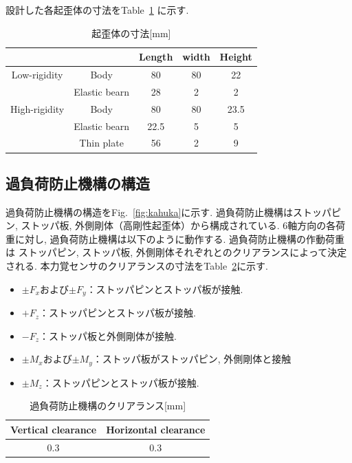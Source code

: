 設計した各起歪体の寸法をTable~\ref{tb:size} に示す. 
\begin{table}[h]
  \caption{起歪体の寸法[mm]}\label{tb:size}
  \begin{center}
   \begin{tabular}{ c c c c c }
    \hline
     & & Length & width & Height  \\
    \hline
    Low-rigidity & Body & 80 & 80 & 22  \\
    \cline{2-5}
     & Elastic bearn & 28 & 2 & 2  \\
    \hline
    High-rigidity & Body & 80 & 80 & 23.5  \\
    \cline{2-5}
     & Elastic bearn & 22.5 & 5 & 5  \\
    \cline{2-5}
     & Thin plate & 56 & 2 & 9 \\
    \hline
   \end{tabular}
  \end{center}
 \end{table}

\subsection{過負荷防止機構の構造}
過負荷防止機構の構造をFig.~\ref{fig:kahuka}に示す. 
過負荷防止機構はストッパピン, ストッパ板, 外側剛体（高剛性起歪体）から構成されている. 
6軸方向の各荷重に対し, 過負荷防止機構は以下のように動作する. 過負荷防止機構の作動荷重は
ストッパピン, ストッパ板, 外側剛体それぞれとのクリアランスによって決定される. 
本力覚センサのクリアランスの寸法をTable~\ref{tb:clea}に示す. 
\\
\begin{itemize}
  \item $\pm F_x$および$\pm F_y$：ストッパピンとストッパ板が接触. 
  \item $+F_z$：ストッパピンとストッパ板が接触. 
  \item $-F_z$：ストッパ板と外側剛体が接触. 
  \item $\pm M_x$および$\pm M_y$：ストッパ板がストッパピン, 外側剛体と接触
  \item $\pm M_z$：ストッパピンとストッパ板が接触. 
\end{itemize}
\begin{table}[h]
  \caption{過負荷防止機構のクリアランス[mm]}\label{tb:clea}
  \begin{center}
   \begin{tabular}{ c c }
    \hline
    Vertical clearance & Horizontal clearance  \\
    \hline
    0.3 & 0.3  \\
    \hline
   \end{tabular}
  \end{center}
 \end{table}

